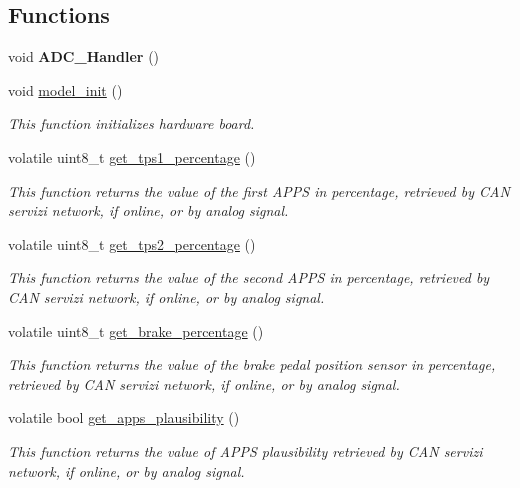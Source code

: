 \subsection*{Functions}
\begin{DoxyCompactItemize}
\item 
\mbox{\label{group___board__model__group_gaedc241164d501dcbc52cde232333c9cf}} 
void {\bfseries A\+D\+C\+\_\+\+Handler} ()
\item 
void \mbox{\hyperlink{group___board__model__group_gace5a444da39d4366693503c53f0841c2}{model\+\_\+init}} ()
\begin{DoxyCompactList}\small\item\em This function initializes hardware board. \end{DoxyCompactList}\item 
volatile uint8\+\_\+t \mbox{\hyperlink{group___board__model__group_ga9239a95f68fab3d9b6832fbe85eb87cd}{get\+\_\+tps1\+\_\+percentage}} ()
\begin{DoxyCompactList}\small\item\em This function returns the value of the first A\+P\+PS in percentage, retrieved by C\+AN servizi network, if online, or by analog signal. \end{DoxyCompactList}\item 
volatile uint8\+\_\+t \mbox{\hyperlink{group___board__model__group_gae563bbe9e3c31913df498ebd7cbf6c10}{get\+\_\+tps2\+\_\+percentage}} ()
\begin{DoxyCompactList}\small\item\em This function returns the value of the second A\+P\+PS in percentage, retrieved by C\+AN servizi network, if online, or by analog signal. \end{DoxyCompactList}\item 
volatile uint8\+\_\+t \mbox{\hyperlink{group___board__model__group_ga6db41e7368919bc4dfafaf4e400ae1a9}{get\+\_\+brake\+\_\+percentage}} ()
\begin{DoxyCompactList}\small\item\em This function returns the value of the brake pedal position sensor in percentage, retrieved by C\+AN servizi network, if online, or by analog signal. \end{DoxyCompactList}\item 
volatile bool \mbox{\hyperlink{group___board__model__group_gae0acabf32ee7f2a82b2f9149ba3d1978}{get\+\_\+apps\+\_\+plausibility}} ()
\begin{DoxyCompactList}\small\item\em This function returns the value of A\+P\+PS plausibility retrieved by C\+AN servizi network, if online, or by analog signal. \end{DoxyCompactList}\item 

\end{DoxyCompactItemize}
